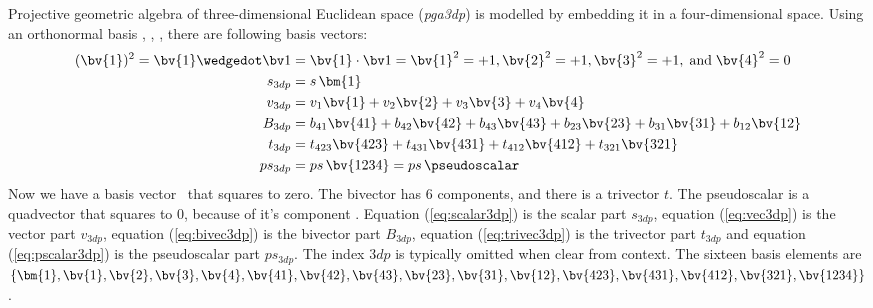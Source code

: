 Projective geometric algebra of three-dimensional Euclidean space (\emph{pga3dp}) is
modelled by embedding it in a four-dimensional space. Using an orthonormal basis ,
, ,  there are following basis vectors:
\begin{subequations}
    \begin{align}
        (\bv{1})^2 = \bv{1} \wedgedot \bv1 & = \bv{1} \cdot \bv1 = \bv{1}^2 = +1,
        \bv{2}^2 = +1, \bv{3}^2 = +1,\;\text{and}\; \bv{4}^2 = 0 \nonumber\\ 
        s_{3dp} & = s \, \bm{1}
        \label{eq:scalar3dp} \\
        v_{3dp} & = v_1\bv{1} + v_2\bv{2} + v_3\bv{3} + v_4\bv{4} 
        \label{eq:vec3dp} \\ 
        B_{3dp} & = b_{41}\bv{41} + b_{42}\bv{42} + b_{43}\bv{43} +
                    b_{23}\bv{23} + b_{31}\bv{31} + b_{12}\bv{12} 
        \label{eq:bivec3dp} \\ 
        t_{3dp} & = t_{423}\bv{423} + t_{431}\bv{431} + t_{412}\bv{412} + t_{321}\bv{321} 
        \label{eq:trivec3dp} \\ 
        ps_{3dp} & = ps \, \bv{1234}  = ps \, \pseudoscalar
        \label{eq:pscalar3dp}
    \end{align}
\end{subequations}
Now we have a basis vector~ that squares to zero. The bivector has 6 components, and
there is a trivector $t$. The pseudoscalar  is a quadvector that
squares to $0$, because of it's component . Equation (\ref{eq:scalar3dp}) is the
scalar part $s_{3dp}$, equation (\ref{eq:vec3dp}) is the vector part $v_{3dp}$, equation
(\ref{eq:bivec3dp}) is the bivector part $B_{3dp}$, equation (\ref{eq:trivec3dp}) is the
trivector part $t_{3dp}$ and equation (\ref{eq:pscalar3dp}) is the pseudoscalar part
$ps_{3dp}$. The index $3dp$ is typically omitted when clear from context. The sixteen
basis elements are $\{\bm{1}, \bv{1}, \bv{2}, \bv{3}, \bv{4}, \bv{41}, \bv{42}, \bv{43},
\bv{23}, \bv{31}, \bv{12}, \bv{423}, \bv{431}, \bv{412}, \bv{321}, \bv{1234}\}$.

